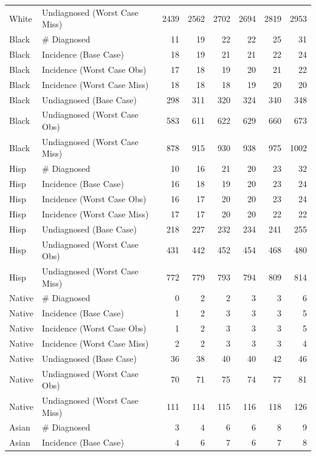 \documentclass{article}\usepackage[]{graphicx}\usepackage[]{color}
\begin{document}
\begin{table}[ht]
{\begin{tabular}{llrrrrrr}
  White & Undiagnosed (Worst Case Miss) & 2439 & 2562 & 2702 & 2694 & 2819 & 2953 \\ 
  Black & \# Diagnosed & 11 & 19 & 22 & 22 & 25 & 31 \\ 
  Black & Incidence (Base Case) & 18 & 19 & 21 & 21 & 22 & 24 \\ 
  Black & Incidence (Worst Case Obs) & 17 & 18 & 19 & 20 & 21 & 22 \\ 
  Black & Incidence (Worst Case Miss) & 18 & 18 & 18 & 19 & 20 & 20 \\ 
  Black & Undiagnosed (Base Case) & 298 & 311 & 320 & 324 & 340 & 348 \\ 
  Black & Undiagnosed (Worst Case Obs) & 583 & 611 & 622 & 629 & 660 & 673 \\ 
  Black & Undiagnosed (Worst Case Miss) & 878 & 915 & 930 & 938 & 975 & 1002 \\ 
  Hisp & \# Diagnosed & 10 & 16 & 21 & 20 & 23 & 32 \\ 
  Hisp & Incidence (Base Case) & 16 & 18 & 19 & 20 & 23 & 24 \\ 
  Hisp & Incidence (Worst Case Obs) & 16 & 17 & 20 & 20 & 23 & 24 \\ 
  Hisp & Incidence (Worst Case Miss) & 17 & 17 & 20 & 20 & 22 & 22 \\ 
  Hisp & Undiagnosed (Base Case) & 218 & 227 & 232 & 234 & 241 & 255 \\ 
  Hisp & Undiagnosed (Worst Case Obs) & 431 & 442 & 452 & 454 & 468 & 480 \\ 
  Hisp & Undiagnosed (Worst Case Miss) & 772 & 779 & 793 & 794 & 809 & 814 \\ 
  Native & \# Diagnosed & 0 & 2 & 2 & 3 & 3 & 6 \\ 
  Native & Incidence (Base Case) & 1 & 2 & 3 & 3 & 3 & 5 \\ 
  Native & Incidence (Worst Case Obs) & 1 & 2 & 3 & 3 & 3 & 5 \\ 
  Native & Incidence (Worst Case Miss) & 2 & 2 & 3 & 3 & 3 & 4 \\ 
  Native & Undiagnosed (Base Case) & 36 & 38 & 40 & 40 & 42 & 46 \\ 
  Native & Undiagnosed (Worst Case Obs) & 70 & 71 & 75 & 74 & 77 & 81 \\ 
  Native & Undiagnosed (Worst Case Miss) & 111 & 114 & 115 & 116 & 118 & 126 \\ 
  Asian & \# Diagnosed & 3 & 4 & 6 & 6 & 8 & 9 \\ 
  Asian & Incidence (Base Case) & 4 & 6 & 7 & 6 & 7 & 8 \\ 

\end{tabular}}
\end{table}
\end{document}
